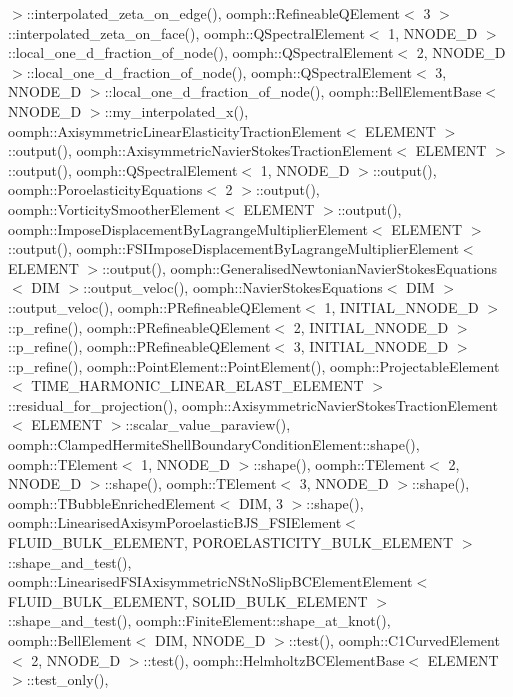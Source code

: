 $>$\+::interpolated\+\_\+zeta\+\_\+on\+\_\+edge(), oomph\+::\+Refineable\+Q\+Element$<$ 3 $>$\+::interpolated\+\_\+zeta\+\_\+on\+\_\+face(), oomph\+::\+Q\+Spectral\+Element$<$ 1, N\+N\+O\+D\+E\+\_\+D $>$\+::local\+\_\+one\+\_\+d\+\_\+fraction\+\_\+of\+\_\+node(), oomph\+::\+Q\+Spectral\+Element$<$ 2, N\+N\+O\+D\+E\+\_\+D $>$\+::local\+\_\+one\+\_\+d\+\_\+fraction\+\_\+of\+\_\+node(), oomph\+::\+Q\+Spectral\+Element$<$ 3, N\+N\+O\+D\+E\+\_\+D $>$\+::local\+\_\+one\+\_\+d\+\_\+fraction\+\_\+of\+\_\+node(), oomph\+::\+Bell\+Element\+Base$<$ N\+N\+O\+D\+E\+\_\+D $>$\+::my\+\_\+interpolated\+\_\+x(), oomph\+::\+Axisymmetric\+Linear\+Elasticity\+Traction\+Element$<$ E\+L\+E\+M\+E\+N\+T $>$\+::output(), oomph\+::\+Axisymmetric\+Navier\+Stokes\+Traction\+Element$<$ E\+L\+E\+M\+E\+N\+T $>$\+::output(), oomph\+::\+Q\+Spectral\+Element$<$ 1, N\+N\+O\+D\+E\+\_\+D $>$\+::output(), oomph\+::\+Poroelasticity\+Equations$<$ 2 $>$\+::output(), oomph\+::\+Vorticity\+Smoother\+Element$<$ E\+L\+E\+M\+E\+N\+T $>$\+::output(), oomph\+::\+Impose\+Displacement\+By\+Lagrange\+Multiplier\+Element$<$ E\+L\+E\+M\+E\+N\+T $>$\+::output(), oomph\+::\+F\+S\+I\+Impose\+Displacement\+By\+Lagrange\+Multiplier\+Element$<$ E\+L\+E\+M\+E\+N\+T $>$\+::output(), oomph\+::\+Generalised\+Newtonian\+Navier\+Stokes\+Equations$<$ D\+I\+M $>$\+::output\+\_\+veloc(), oomph\+::\+Navier\+Stokes\+Equations$<$ D\+I\+M $>$\+::output\+\_\+veloc(), oomph\+::\+P\+Refineable\+Q\+Element$<$ 1, I\+N\+I\+T\+I\+A\+L\+\_\+\+N\+N\+O\+D\+E\+\_\+D $>$\+::p\+\_\+refine(), oomph\+::\+P\+Refineable\+Q\+Element$<$ 2, I\+N\+I\+T\+I\+A\+L\+\_\+\+N\+N\+O\+D\+E\+\_\+D $>$\+::p\+\_\+refine(), oomph\+::\+P\+Refineable\+Q\+Element$<$ 3, I\+N\+I\+T\+I\+A\+L\+\_\+\+N\+N\+O\+D\+E\+\_\+D $>$\+::p\+\_\+refine(), oomph\+::\+Point\+Element\+::\+Point\+Element(), oomph\+::\+Projectable\+Element$<$ T\+I\+M\+E\+\_\+\+H\+A\+R\+M\+O\+N\+I\+C\+\_\+\+L\+I\+N\+E\+A\+R\+\_\+\+E\+L\+A\+S\+T\+\_\+\+E\+L\+E\+M\+E\+N\+T $>$\+::residual\+\_\+for\+\_\+projection(), oomph\+::\+Axisymmetric\+Navier\+Stokes\+Traction\+Element$<$ E\+L\+E\+M\+E\+N\+T $>$\+::scalar\+\_\+value\+\_\+paraview(), oomph\+::\+Clamped\+Hermite\+Shell\+Boundary\+Condition\+Element\+::shape(), oomph\+::\+T\+Element$<$ 1, N\+N\+O\+D\+E\+\_\+D $>$\+::shape(), oomph\+::\+T\+Element$<$ 2, N\+N\+O\+D\+E\+\_\+D $>$\+::shape(), oomph\+::\+T\+Element$<$ 3, N\+N\+O\+D\+E\+\_\+D $>$\+::shape(), oomph\+::\+T\+Bubble\+Enriched\+Element$<$ D\+I\+M, 3 $>$\+::shape(), oomph\+::\+Linearised\+Axisym\+Poroelastic\+B\+J\+S\+\_\+\+F\+S\+I\+Element$<$ F\+L\+U\+I\+D\+\_\+\+B\+U\+L\+K\+\_\+\+E\+L\+E\+M\+E\+N\+T, P\+O\+R\+O\+E\+L\+A\+S\+T\+I\+C\+I\+T\+Y\+\_\+\+B\+U\+L\+K\+\_\+\+E\+L\+E\+M\+E\+N\+T $>$\+::shape\+\_\+and\+\_\+test(), oomph\+::\+Linearised\+F\+S\+I\+Axisymmetric\+N\+St\+No\+Slip\+B\+C\+Element\+Element$<$ F\+L\+U\+I\+D\+\_\+\+B\+U\+L\+K\+\_\+\+E\+L\+E\+M\+E\+N\+T, S\+O\+L\+I\+D\+\_\+\+B\+U\+L\+K\+\_\+\+E\+L\+E\+M\+E\+N\+T $>$\+::shape\+\_\+and\+\_\+test(), oomph\+::\+Finite\+Element\+::shape\+\_\+at\+\_\+knot(), oomph\+::\+Bell\+Element$<$ D\+I\+M, N\+N\+O\+D\+E\+\_\+D $>$\+::test(), oomph\+::\+C1\+Curved\+Element$<$ 2, N\+N\+O\+D\+E\+\_\+D $>$\+::test(), oomph\+::\+Helmholtz\+B\+C\+Element\+Base$<$ E\+L\+E\+M\+E\+N\+T $>$\+::test\+\_\+only(), 